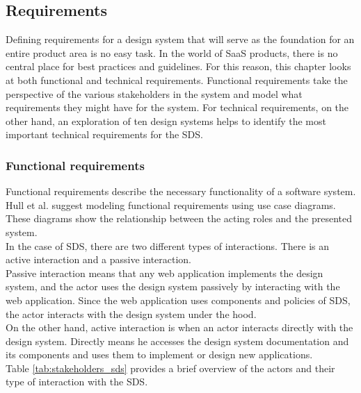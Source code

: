 \subsection{Requirements}\label{sds_requirements}
Defining requirements for a design system that will serve as the foundation for an entire product area is no easy task. In the world of \ac{SaaS} products, there is no central place for best practices and guidelines. For this reason, this chapter looks at both functional and technical requirements. Functional requirements take the perspective of the various stakeholders in the system and model what requirements they might have for the system. For technical requirements, on the other hand, an exploration of ten design systems helps to identify the most important technical requirements for the \ac{SDS}.
\subsubsection{Functional requirements}
Functional requirements describe the necessary functionality of a software system. Hull et al. suggest modeling functional requirements using use case diagrams. These diagrams show the relationship between the acting roles and the presented system.\cite{hull_requirements_2011} \\
In the case of \ac{SDS}, there are two different types of interactions. There is an active interaction and a passive interaction. \\
Passive interaction means that any web application implements the design system, and the actor uses the design system passively by interacting with the web application. Since the web application uses components and policies of \ac{SDS}, the actor interacts with the design system under the hood. \\
On the other hand, active interaction is when an actor interacts directly with the design system. Directly means he accesses the design system documentation and its components and uses them to implement or design new applications. \\
Table \ref{tab:stakeholders_sds} provides a brief overview of the actors and their type of interaction with the \ac{SDS}.
